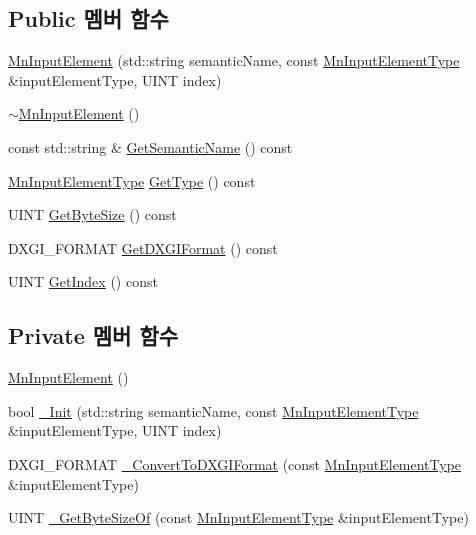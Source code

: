 \subsection*{Public 멤버 함수}
\begin{DoxyCompactItemize}
\item 
\hyperlink{class_m_n_l_1_1_mn_input_element_a0a2c66ec037982166078a9d6d2318aa2}{Mn\+Input\+Element} (std\+::string semantic\+Name, const \hyperlink{namespace_m_n_l_a8605571a36b2bb477280767d71fe6f9e}{Mn\+Input\+Element\+Type} \&input\+Element\+Type, U\+I\+NT index)
\item 
\hyperlink{class_m_n_l_1_1_mn_input_element_a42dc56f9038c224c826dafac6257fa29}{$\sim$\+Mn\+Input\+Element} ()
\item 
const std\+::string \& \hyperlink{class_m_n_l_1_1_mn_input_element_a6aa08fd62581e1eddc7e632de0bd9564}{Get\+Semantic\+Name} () const
\item 
\hyperlink{namespace_m_n_l_a8605571a36b2bb477280767d71fe6f9e}{Mn\+Input\+Element\+Type} \hyperlink{class_m_n_l_1_1_mn_input_element_a21970e5ba0187033e34bec04da162741}{Get\+Type} () const
\item 
U\+I\+NT \hyperlink{class_m_n_l_1_1_mn_input_element_a1bdc917e5920941e913048e6a39eaa48}{Get\+Byte\+Size} () const
\item 
D\+X\+G\+I\+\_\+\+F\+O\+R\+M\+AT \hyperlink{class_m_n_l_1_1_mn_input_element_ac9856490638cc98b23e533782107e4a6}{Get\+D\+X\+G\+I\+Format} () const
\item 
U\+I\+NT \hyperlink{class_m_n_l_1_1_mn_input_element_a314bdce70c4781632737c247c040f014}{Get\+Index} () const
\end{DoxyCompactItemize}
\subsection*{Private 멤버 함수}
\begin{DoxyCompactItemize}
\item 
\hyperlink{class_m_n_l_1_1_mn_input_element_a3ac0bac42c3d2d6e1edf29f28df54190}{Mn\+Input\+Element} ()
\item 
bool \hyperlink{class_m_n_l_1_1_mn_input_element_aae3dcc9e65bf14d53d7fc92803eb20da}{\+\_\+\+Init} (std\+::string semantic\+Name, const \hyperlink{namespace_m_n_l_a8605571a36b2bb477280767d71fe6f9e}{Mn\+Input\+Element\+Type} \&input\+Element\+Type, U\+I\+NT index)
\item 
D\+X\+G\+I\+\_\+\+F\+O\+R\+M\+AT \hyperlink{class_m_n_l_1_1_mn_input_element_adae99b575f381bd5241f4d9df7c8d56b}{\+\_\+\+Convert\+To\+D\+X\+G\+I\+Format} (const \hyperlink{namespace_m_n_l_a8605571a36b2bb477280767d71fe6f9e}{Mn\+Input\+Element\+Type} \&input\+Element\+Type)
\item 
U\+I\+NT \hyperlink{class_m_n_l_1_1_mn_input_element_ad84bf259c4a3674490f5b789b4f21e67}{\+\_\+\+Get\+Byte\+Size\+Of} (const \hyperlink{namespace_m_n_l_a8605571a36b2bb477280767d71fe6f9e}{Mn\+Input\+Element\+Type} \&input\+Element\+Type)
\end{DoxyCompactItemize}
